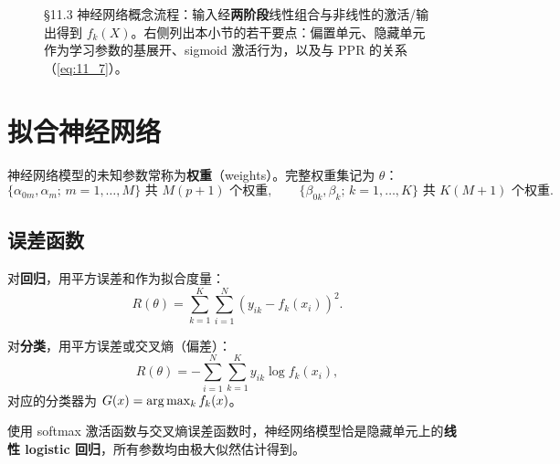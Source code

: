 \begin{figure}[htbp]
    \caption{§11.3 神经网络概念流程：输入经\textbf{两阶段}线性组合与非线性的激活/输出得到 $f_k(X)$。右侧列出本小节的若干要点：偏置单元、隐藏单元作为学习参数的基展开、sigmoid 激活行为，以及与 PPR 的关系（\ref{eq:11_7}）。}
    \label{fig:11_3flow}
\end{figure}

\section{拟合神经网络}

神经网络模型的未知参数常称为\textbf{权重}（weights）。完整权重集记为 $\theta$：
\begin{equation}
\{\alpha_{0m}, \alpha_m;\, m=1,\dots,M\} \text{ 共 } M(p+1) \text{ 个权重}, \qquad
\{\beta_{0k}, \beta_k;\, k=1,\dots,K\} \text{ 共 } K(M+1) \text{ 个权重}. \label{eq:11_8}
\end{equation}

\subsection{误差函数}

对\textbf{回归}，用平方误差和作为拟合度量：
\begin{equation}
R(\theta) = \sum_{k=1}^{K} \sum_{i=1}^{N} \left( y_{ik} - f_k(x_i) \right)^2. \label{eq:11_9}
\end{equation}

对\textbf{分类}，用平方误差或交叉熵（偏差）：
\begin{equation}
R(\theta) = -\sum_{i=1}^{N} \sum_{k=1}^{K} y_{ik} \log f_k(x_i), \label{eq:11_10}
\end{equation}
对应的分类器为 $G(x) = \arg\max_k f_k(x)$。

\begin{remark}[softmax + 交叉熵 = 极大似然]
使用 softmax 激活函数与交叉熵误差函数时，神经网络模型恰是隐藏单元上的\textbf{线性 logistic 回归}，所有参数均由极大似然估计得到。
\end{remark}

